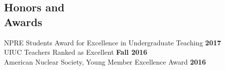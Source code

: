 \documentclass[margin,line]{resume}
\begin{document}
\begin{resume}
    \section{\mysidestyle Honors and\\Awards}
                NPRE Students Award for Excellence in Undergraduate Teaching \hfill \textbf{2017}\vspace{.5mm}\\%
                UIUC Teachers Ranked as Excellent \hfill \textbf{Fall 2016}\vspace{.5mm}\\%
                American Nuclear Society, Young Member Excellence Award                         \hfill \textbf{2016}\vspace{.5mm}\\%
%
%

\end{resume}
\end{document}
